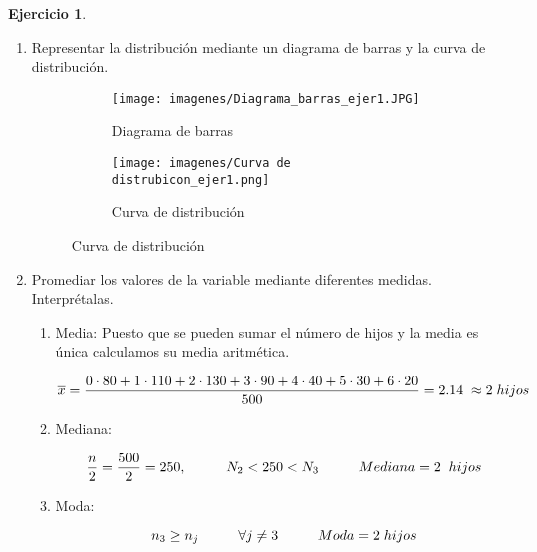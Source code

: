 \documentclass[a4paper, 12pt]{article}
\theoremstyle{definition}
\newtheorem{ej}{Ejercicio}
\begin{document}
\begin{ej}
\begin{enumerate}[label=\textit{\alph*})]
    \item Representar la distribución mediante un diagrama de barras y la curva de distribución.
    
    \begin{figure}[h!]
        \centering
        \begin{subfigure}[b]{0.45\linewidth}
        \texttt{[image: imagenes/Diagrama\_barras\_ejer1.JPG]}
        \caption{Diagrama de barras}
        \end{subfigure}
        \begin{subfigure}[b]{0.45\linewidth}
        \texttt{[image: imagenes/Curva de distrubicon\_ejer1.png]}
        \caption{Curva de distribución}
        \end{subfigure}
    \end{figure}
    
    \newpage
    
    \item Promediar los valores de la variable mediante diferentes medidas. Interprétalas.
    
    \begin{enumerate}[label=\textit{\roman*})]
        \item Media: Puesto que se pueden sumar el número de hijos y la media es única calculamos su media aritmética.
        
        \[
        \overline{x} =\frac{0\cdot80 + 1\cdot110 + 2\cdot130 + 3\cdot90 + 4\cdot40 + 5\cdot30 + 6\cdot20}{500} = 2.14 \hspace{0.1cm} \approx 2 \hspace{0.1cm} hijos
        \]
        
        \item Mediana:
        
        \[
            \frac{n}{2} = \frac{500}{2} = 250, \hspace{1cm} N_2 < 250 < N_3 \hspace{1cm} Mediana = 2 \hspace{0.2cm}hijos
        \]
        
        \item Moda:
        
        \[
            n_3 \geq n_j \hspace{1cm} \forall j \neq 3 \hspace{1cm} Moda = 2 \hspace{0.1cm} hijos
        \]
        
    \end{enumerate}
    
\end{enumerate}

\end{ej}
\end{document}
